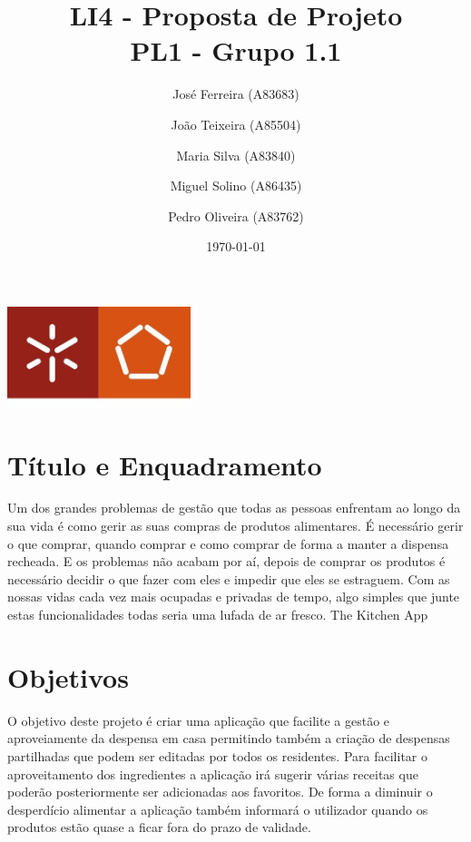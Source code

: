 \documentclass[a4paper]{report}
\begin{document}
\title{LI4 - Proposta de Projeto\\ 
\large PL1 - Grupo 1.1}
\author{José Ferreira (A83683) \and João Teixeira (A85504) \and Maria Silva
(A83840) \and Miguel Solino (A86435) \and Pedro Oliveira (A83762)}
\date{\today}

\begin{center}
    \begin{minipage}{0.75\linewidth}
        \centering
        \includegraphics[width=0.4\textwidth]{images/eng.jpeg}\par\vspace{1cm}
        \vspace{1.5cm}
        \href{https://www.uminho.pt/PT}
        {\color{black}{\scshape\LARGE Universidade do Minho}} \par
        \vspace{1cm}
        \href{https://www.di.uminho.pt/}
        {\color{black}{\scshape\Large Departamento de Informática}} \par
        \vspace{1.5cm}
        \maketitle
    \end{minipage}
\end{center}

\pagebreak
\section{Título e Enquadramento}
Um dos grandes problemas de gestão que todas as pessoas enfrentam ao longo da
sua vida é como gerir as suas compras de produtos alimentares. É necessário
gerir o que comprar, quando comprar e como comprar de forma a manter a dispensa
recheada. E os problemas não acabam por aí, depois de comprar os produtos é
necessário decidir o que fazer com eles e impedir que eles se estraguem. Com as
nossas vidas cada vez mais ocupadas e privadas de tempo, algo simples que junte
estas funcionalidades todas seria uma lufada de ar fresco.
The Kitchen App

\section{Objetivos}
O objetivo deste projeto é criar uma aplicação que facilite a gestão e
aproveiamente da despensa em casa permitindo também a criação de despensas
partilhadas que podem ser editadas por todos os residentes.
Para facilitar o aproveitamento dos ingredientes a aplicação irá sugerir várias
receitas que poderão posteriormente ser adicionadas aos favoritos. De forma a
diminuir o desperdício alimentar a aplicação também informará o utilizador
quando os produtos estão quase a ficar fora do prazo de validade.
\end{document}
